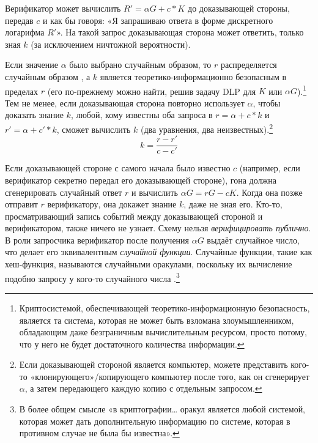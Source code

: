 Верификатор может вычислить $R' = \alpha G + c*K$ до доказывающей стороны, передав $c$ и как бы говоря: «Я запрашиваю ответа в форме дискретного логарифма $R'$». На такой запрос доказывающая сторона может ответить, только зная $k$ (за исключением ничтожной вероятности).

Если значение $\alpha$ было выбрано случайным образом, то $r$ распределяется случайным образом \cite{SCOZZAFAVA1993313}, а $k$ является теоретико-информационно безопасным в пределах $r$ (его по-прежнему можно найти, решив задачу DLP для $K$ или $\alpha G$).\footnote{\label{information_theoretic_note}Криптосистемой, обеспечивающей теоретико-информационную безопасность, является та система, которая не может быть взломана злоумышленником, обладающим даже безграничным вычислительным ресурсом, просто потому, что у него не будет достаточного количества информации.} Тем не менее, если доказывающая сторона повторно использует $\alpha$, чтобы доказать знание $k$, любой, кому известны оба запроса в $r = \alpha + c*k$ и $r' = \alpha + c'*k$, сможет вычислить $k$ (два уравнения, два неизвестных).\footnote{Если доказывающей стороной является компьютер, можете представить кого-то «клонирующего»/копирующего компьютер после того, как он сгенерирует $\alpha$, а затем передающего каждую копию с отдельным запросом.}\vspace{.175cm}%
\[k = \frac{r-r'}{c-c'}\]

Если доказывающей стороне с самого начала было известно $c$ (например, если верификатор секретно передал его доказывающей стороне), гона должна сгенерировать случайный ответ $r$ и вычислить $\alpha G = r G - c K$. Когда она позже отправит $r$ верификатору, она докажет знание $k$, даже не зная его. Кто-то, просматривающий запись событий между доказывающей стороной и верификатором, также ничего не узнает. Схему нельзя {\em верифицировать публично}. \cite{Signatures2015BorromeanRS}\\

В роли запросчика верификатор после получения $\alpha G$ выдаёт случайное число, что делает его эквивалентным {\em случайной функции}. Случайные функции, такие как хеш-функция, называ\-ются случайными оракулами, поскольку их вычисление подобно запросу у кого-то случайного числа \cite{Signatures2015BorromeanRS}.\footnote{В более общем смысле «в криптографии… оракул является любой системой, которая может дать дополнительную информацию по системе, которая в противном случае не была бы известна».\cite{cryptographic-oracle}}\\

